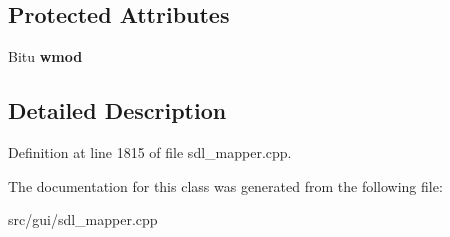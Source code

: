 \subsection*{Protected Attributes}
\begin{DoxyCompactItemize}
\item 
\hypertarget{classCModEvent_a54a25228b8da694c33c44e4b161defd9}{Bitu {\bfseries wmod}}\label{classCModEvent_a54a25228b8da694c33c44e4b161defd9}

\end{DoxyCompactItemize}


\subsection{Detailed Description}


Definition at line 1815 of file sdl\-\_\-mapper.\-cpp.



The documentation for this class was generated from the following file\-:\begin{DoxyCompactItemize}
\item 
src/gui/sdl\-\_\-mapper.\-cpp\end{DoxyCompactItemize}

